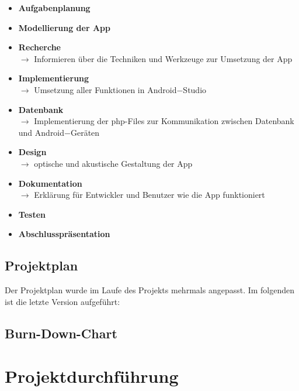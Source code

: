 \documentclass[12pt, a4paper]{article}
\begin{document}
\begin{itemize}

\item \textbf{Aufgabenplanung}   

\item \textbf{Modellierung der App} 

\item \textbf{Recherche} \\
$\rightarrow$ Informieren über die Techniken und Werkzeuge zur Umsetzung der App

\item \textbf{Implementierung} \\
$\rightarrow$ Umsetzung aller Funktionen in Android$-$Studio

\item \textbf{Datenbank} \\
$\rightarrow$ Implementierung der php-Files zur Kommunikation zwischen Datenbank und Android$-$Geräten

\item \textbf{Design} \\
$\rightarrow$ optische und akustische Gestaltung der App

\item \textbf{Dokumentation} \\
$\rightarrow$ Erklärung für Entwickler und Benutzer wie die App funktioniert

\item \textbf{Testen} 

\item \textbf{Abschlusspräsentation} 

\end{itemize}
		

	\subsection{Projektplan}

Der Projektplan wurde im Laufe des Projekts mehrmals angepasst. Im folgenden ist die letzte Version aufgeführt: 




	\subsection{Burn-Down-Chart}



\section{Projektdurchführung}
\end{document}
